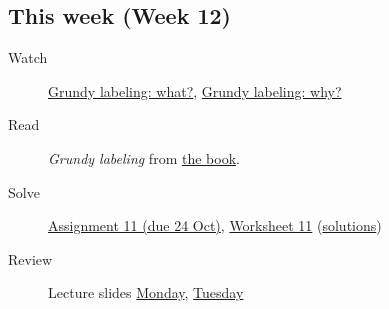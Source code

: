 \documentclass{amsart}
\begin{document}
\subsection{This week (Week 12)}
\label{sec:orgc735b78}
\begin{description}
\item[{Watch}] \href{https://canvas.anu.edu.au/files/1234702/}{Grundy labeling: what?}, \href{https://canvas.anu.edu.au/files/1234703/}{Grundy labeling: why?}
\item[{Read}] \emph{Grundy labeling} from \href{https://canvas.anu.edu.au/files/715877/}{the book}.
\item[{Solve}] \href{https://canvas.anu.edu.au/files/1242935/download?download\_frd=1\&verifier=Ipf81ETJH7KLDTXvtOwAGUQ97ziSgx8r6cMutZM8}{Assignment 11 (due 24 Oct)}, \href{https://canvas.anu.edu.au/files/1275923/download?download\_frd=1\&verifier=rrx48Ktcal3nY1xxioKjgRGhHONugIgrRtREjAfH}{Worksheet 11} (\href{https://canvas.anu.edu.au/files/1317954/download?download\_frd=1\&verifier=bydsW41CpSYPc047AAgkrt16kXBTflxSqV9FEVDV}{solutions})
\item[{Review}] Lecture slides \href{https://canvas.anu.edu.au/files/1251544/download?download\_frd=1\&verifier=6UHcbjMN0TpaZAaYXc8h7Kn5PiRZk3hBQnOQw6GJ}{Monday}, \href{https://canvas.anu.edu.au/files/1254914/download?download\_frd=1\&verifier=qwWhEbbHIgn4U7ZFUN4jthzS11VLQAQg3BiCKrRz}{Tuesday}
\end{description}
\end{document}
